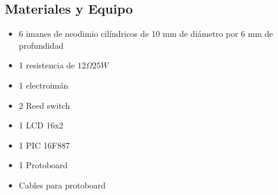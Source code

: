 \subsection{Materiales y Equipo}
\begin{multicols}{2}
\begin{itemize}
 \item 6 imanes de neodimio cil\'indricos de 10 mm de di\'ametro por 6 mm de profundidad
 \item 1 resistencia de $12 \Omega 25 W$
 \item 1 electroim\'an
 \item 2 Reed switch
 \item 1 LCD 16x2
 \item 1 PIC 16F887
 \item 1 Protoboard
 \item Cables para protoboard
\end{itemize}
\end{multicols}
